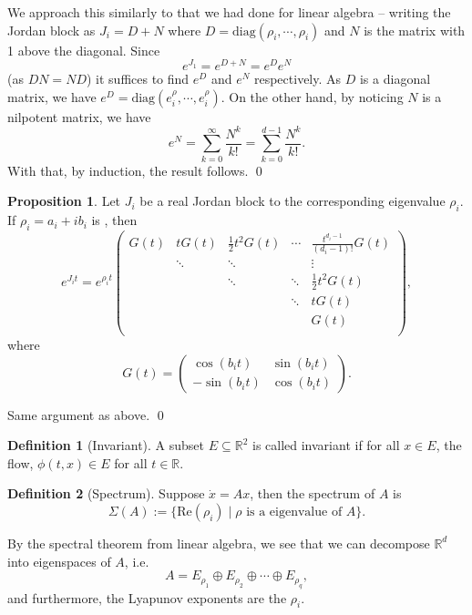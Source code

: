 \documentclass[
]{article}
\theoremstyle{definition}
\newtheorem{prop}{Proposition}
\theoremstyle{definition}
\newtheorem{definition}{Definition}[section]
\begin{document}
We approach this similarly to that we had done for linear algebra --
writing the Jordan block as \(J_i = D + N\) where
\(D = \text{diag}(\rho_i, \cdots, \rho_i)\) and \(N\) is the matrix with
1 above the diagonal. Since \[e^{J_1} = e^{D + N} = e^D e^N\] (as
\(DN = ND\)) it suffices to find \(e^D\) and \(e^N\) respectively. As
\(D\) is a diagonal matrix, we have
\(e^D = \text{diag}(e^\rho_i, \cdots, e^\rho_i)\). On the other hand, by
noticing \(N\) is a nilpotent matrix, we have
\[e^N = \sum_{k = 0}^\infty \frac{N^k}{k!} = \sum_{k = 0}^{d - 1} \frac{N^k}{k!}.\]
With that, by induction, the result follows. \qed

\begin{prop}
  Let \(J_i\) be a real Jordan block to the corresponding eigenvalue \(\rho_i\). If 
  \(\rho_i = a_i + ib_i\) is , then 
  \[e^{J_i t} = e^{\rho_i t} 
    \begin{pmatrix}
      G(t) & tG(t) & \frac{1}{2}t^2G(t) & \cdots & \frac{t^{d_i - 1}}{(d_i - 1)!}G(t)\\
        & \ddots & \ddots    & & \vdots\\
        &   & \ddots & \ddots & \frac{1}{2}t^2G(t)\\
        &   &   & \ddots & tG(t)\\
        &   &   &   & G(t)\\
    \end{pmatrix},\]
  where 
  \[G(t) = \begin{pmatrix}
    \cos(b_i t) & \sin(b_i t)\\ -\sin(b_i t) & \cos(b_i t)
  \end{pmatrix}.\]
\end{prop}
\proof

Same argument as above. \qed

\begin{definition}[Invariant]
  A subset \(E \subseteq \mathbb{R}^2\) is called invariant if for all \(x \in E\), 
  the flow, \(\phi(t, x) \in E\) for all \(t \in \mathbb{R}\).
\end{definition}

\begin{definition}[Spectrum]
  Suppose \(\dot x = A x\), then the spectrum of \(A\) is 
  \[\Sigma(A) := \{ \text{Re}(\rho_i) \mid \rho \text{ is a eigenvalue of } A\}.\]
\end{definition}

By the spectral theorem from linear algebra, we see that we can
decompose \(\mathbb{R}^d\) into eigenspaces of \(A\), i.e.~
\[A = E_{\rho_1} \oplus E_{\rho_2} \oplus \cdots \oplus E_{\rho_q},\]
and furthermore, the Lyapunov exponents are the \(\rho_i\).
\end{document}
